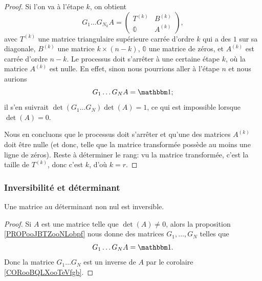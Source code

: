 \begin{proof}
    Si l'on va à l'étape \(k \), on obtient
        \begin{equation}
        G_1\ldots G_{N_k}A=
      \begin{pmatrix}
            T^{(k)}    &   B^{(k)}\\ 
            \mathbb 0 & A^{(k)}
        \end{pmatrix},
    \end{equation}
    avec \( T^{(k)} \) une matrice triangulaire supérieure carrée d'ordre \( k \) qui a des \( 1 \) sur sa diagonale, \( B^{(k)} \) une matrice \( k \times (n-k) \), \( \mathbb 0 \) une matrice de zéros, et  \( A^{(k)} \) est carrée d'ordre \( n - k \). Le processus doit s'arrêter à une certaine étape \( k \), où la matrice \( A^{(k)} \)  est nulle. En effet, sinon nous pourrions aller à l'étape \( n \) et nous aurions
    \begin{equation}
        G_1\ldots G_NA=\mtu;
    \end{equation}
    il s'en suivrait \( \det(G_1\ldots G_N)\det(A)=1\), ce qui est impossible lorsque \( \det(A)=0\).
    
Nous en concluons que le processus doit s'arrêter et qu'une des matrices \( A^{(k)}\) doit être nulle (et donc, telle que la matrice transformée possède au moins une ligne de zéros). Reste à déterminer le rang: vu la matrice transformée, c'est la taille de \( T^{(k)} \), donc c'est \( k \), d'où \( k = r \).
\end{proof}

\subsubsection{Inversibilité et déterminant}

\begin{proposition}     \label{PROPooAVIXooMtVCet}
    Une matrice au déterminant non nul est inversible.
\end{proposition}

\begin{proof}
    Si \( A\) est une matrice telle que \( \det(A)\neq 0\), alors la proposition \ref{PROPooJBTZooNLobpf} nous donne des matrices \( G_1,\ldots, G_N\) telles que
    \begin{equation}
        G_1\ldots G_NA=\mtu.
    \end{equation}
    Donc la matrice \( G_1\ldots G_N\) est un inverse de \( A\) par le corolaire \ref{CORooBQLXooTeVfgb}.
\end{proof}

